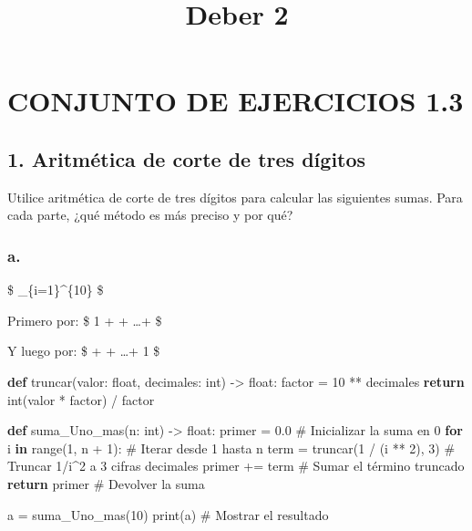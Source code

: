 \documentclass[
  letterpaper,
  DIV=11,
  numbers=noendperiod]{scrartcl}
\title{Deber 2}
\author{}
\date{}
\newenvironment{Shaded}{\begin{snugshade}}{\end{snugshade}}
\newcommand{\BuiltInTok}[1]{\textcolor[rgb]{0.00,0.23,0.31}{#1}}
\newcommand{\CommentTok}[1]{\textcolor[rgb]{0.37,0.37,0.37}{#1}}
\newcommand{\ControlFlowTok}[1]{\textcolor[rgb]{0.00,0.23,0.31}{\textbf{#1}}}
\newcommand{\DecValTok}[1]{\textcolor[rgb]{0.68,0.00,0.00}{#1}}
\newcommand{\FloatTok}[1]{\textcolor[rgb]{0.68,0.00,0.00}{#1}}
\newcommand{\KeywordTok}[1]{\textcolor[rgb]{0.00,0.23,0.31}{\textbf{#1}}}
\newcommand{\NormalTok}[1]{\textcolor[rgb]{0.00,0.23,0.31}{#1}}
\newcommand{\OperatorTok}[1]{\textcolor[rgb]{0.37,0.37,0.37}{#1}}
\begin{document}
\maketitle


\section{CONJUNTO DE EJERCICIOS 1.3}\label{conjunto-de-ejercicios-1.3}

\subsection{1. Aritmética de corte de tres
dígitos}\label{aritmuxe9tica-de-corte-de-tres-duxedgitos}

Utilice aritmética de corte de tres dígitos para calcular las siguientes
sumas. Para cada parte, ¿qué método es más preciso y por qué?

\subsubsection{a.}\label{a.}

\$ \sum\_\{i=1\}\^{}\{10\}  \$

Primero por: \$ 1 +  + \ldots +  \$

Y luego por: \$  +  + \ldots + 1 \$

\begin{Shaded}
\begin{Highlighting}[]
\KeywordTok{def}\NormalTok{ truncar(valor: }\BuiltInTok{float}\NormalTok{, decimales: }\BuiltInTok{int}\NormalTok{) }\OperatorTok{{-}\textgreater{}} \BuiltInTok{float}\NormalTok{:}
\NormalTok{    factor }\OperatorTok{=} \DecValTok{10} \OperatorTok{**}\NormalTok{ decimales}
    \ControlFlowTok{return} \BuiltInTok{int}\NormalTok{(valor }\OperatorTok{*}\NormalTok{ factor) }\OperatorTok{/}\NormalTok{ factor}

\KeywordTok{def}\NormalTok{ suma\_Uno\_mas(n: }\BuiltInTok{int}\NormalTok{) }\OperatorTok{{-}\textgreater{}} \BuiltInTok{float}\NormalTok{:}
\NormalTok{    primer }\OperatorTok{=} \FloatTok{0.0}  \CommentTok{\# Inicializar la suma en 0}
    \ControlFlowTok{for}\NormalTok{ i }\KeywordTok{in} \BuiltInTok{range}\NormalTok{(}\DecValTok{1}\NormalTok{, n }\OperatorTok{+} \DecValTok{1}\NormalTok{):  }\CommentTok{\# Iterar desde 1 hasta n}
\NormalTok{        term }\OperatorTok{=}\NormalTok{ truncar(}\DecValTok{1} \OperatorTok{/}\NormalTok{ (i }\OperatorTok{**} \DecValTok{2}\NormalTok{), }\DecValTok{3}\NormalTok{)  }\CommentTok{\# Truncar 1/i\^{}2 a 3 cifras decimales}
\NormalTok{        primer }\OperatorTok{+=}\NormalTok{ term  }\CommentTok{\# Sumar el término truncado}
    \ControlFlowTok{return}\NormalTok{ primer  }\CommentTok{\# Devolver la suma}

\NormalTok{a }\OperatorTok{=}\NormalTok{ suma\_Uno\_mas(}\DecValTok{10}\NormalTok{)  }
\BuiltInTok{print}\NormalTok{(a)  }\CommentTok{\# Mostrar el resultado}
\end{Highlighting}
\end{Shaded}
\end{document}
